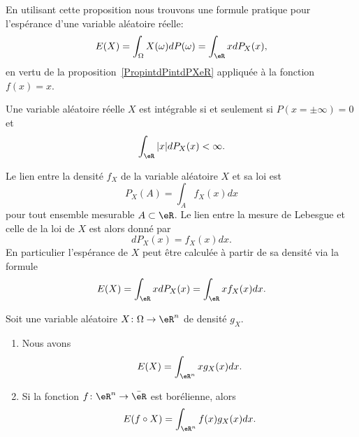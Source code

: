 En utilisant cette proposition nous trouvons une formule pratique pour l'espérance d'une variable aléatoire réelle:
\begin{equation}
	E(X)=\int_{\Omega}X(\omega)dP(\omega)=\int_{\eR}xdP_X(x),
\end{equation}
en vertu de la proposition~\ref{PropintdPintdPXeR} appliquée à la fonction \( f(x)=x\).

\begin{proposition}     \label{PROPooNNTNooOmCLvy}
	Une variable aléatoire réelle \( X\) est intégrable si et seulement si \( P(x=\pm\infty)=0\) et
	\begin{equation}
		\int_{\eR}| x |dP_X(x)<\infty.
	\end{equation}
\end{proposition}

Le lien entre la densité \( f_X\) de la variable aléatoire \( X\) et sa loi est
\begin{equation}
	P_X(A)=\int_Af_X(x)dx
\end{equation}
pour tout ensemble mesurable \( A\subset\eR\). Le lien entre la mesure de Lebesgue et celle de la loi de \( X\) est alors donné par
\begin{equation}
	dP_X(x)=f_X(x)dx.
\end{equation}
En particulier l'espérance de \( X\) peut être calculée à partir de sa densité via la formule
\begin{equation}        \label{EqEspDensform}
	E(X)=\int_{\eR}xdP_X(x)=\int_{\eR}x f_X(x)dx.
\end{equation}

\begin{lemma}       \label{LEMooYVJAooXUkRTh}
	Soit une variable aléatoire \( X\colon \Omega \to \eR^n\) de densité \( g_X\).
	\begin{enumerate}
		\item       \label{ITEMooBUWNooJkiRPp}
		      Nous avons
		      \begin{equation}
			      E(X)=\int_{\eR^n}xg_X(x)dx.
		      \end{equation}
		\item       \label{ITEMooKZHAooKQQmno}
		      Si la fonction \( f\colon \eR^n\to \bar\eR\) est borélienne, alors
		      \begin{equation}
			      E(f\circ X)=\int_{\eR^n}f(x)g_X(x)dx.
		      \end{equation}
	\end{enumerate}
\end{lemma}

